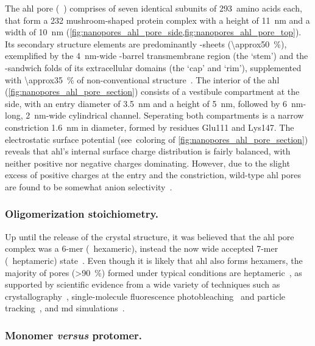 The \gls{ahl} pore (~\cite{Song-1996}) comprises of seven identical subunits of 293~amino acids
each, that form a \SI{232}{\kDa} mushroom-shaped protein complex with a height of \SI{11}{\nm} and a width of
\SI{10}{\nm} (\cref{fig:nanopores_ahl_pore_side,fig:nanopores_ahl_pore_top}). Its secondary structure elements
are predominantly \tb-sheets (\SI{\approx50}{\percent}), exemplified by the \SI{4}{\nm}-wide \tb-barrel
transmembrane region (the `stem') and the \tb-sandwich folds of its extracellular domains (the `cap' and
`rim'), supplemented with \SI{\approx35}{\percent} of non-conventional structure~\cite{Song-1996}. The
interior of the \gls{ahl} (\cref{fig:nanopores_ahl_pore_section}) consists of a vestibule compartment at the
\cisi{} side, with an entry diameter of \SI{3.5}{\nm} and a height of \SI{5}{\nm}, followed by
\SI{6}{\nm}-long, \SI{2}{\nm}-wide cylindrical channel. Seperating both compartments is a narrow constriction
\SI{1.6}{\nm} in diameter, formed by residues Glu111 and Lys147. The electrostatic surface potential
(see~coloring of \cref{fig:nanopores_ahl_pore_section}) reveals that \gls{ahl}'s internal surface charge
distribution is fairly balanced, with neither positive nor negative charges dominating. However, due to the
slight excess of positive charges at the \cisi{} entry and the constriction, wild-type \gls{ahl} pores are
found to be somewhat anion selectivity~\cite{Menestrina-1986}.


\subsubsection{Oligomerization stoichiometry.}
%

Up until the release of the crystal structure, it was believed that the \gls{ahl} pore complex was a 6-mer
(\ie~hexameric), instead the now wide accepted 7-mer (\ie~heptameric) state~\cite{Song-1996}. Even though it
is likely that \gls{ahl} also forms hexamers, the majority of pores (\SI{>90}{\percent}) formed under typical
conditions are heptameric~\cite{Menestrina-1986}, as supported by scientific evidence from a wide variety of
techniques such as crystallography~\cite{Song-1996,Galdiero-2004}, single-molecule fluorescence
photobleaching~\cite{Das-2007} and particle tracking~\cite{Thompson-2011}, and \gls{md}
simulations~\cite{Aksimentiev-2005,Bhattacharya-2011,Basdevant-2019}. 


\subsubsection{Monomer \textit{versus} protomer.}
%


